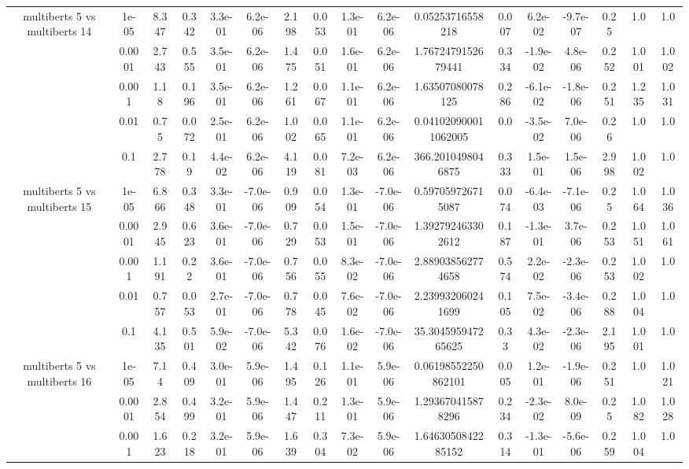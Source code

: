 \begin{tabular}{|c|c|c|c|c|c|c|c|c|c|c|c|c|c|c|c|c|}
\hline
\multirow{5}{*}{multiberts 5 vs multiberts 14} & 1e-05 & 8.347 & 0.342 & 3.3e-01 & 6.2e-06 & 2.198 & 0.053 & 1.3e-01 & 6.2e-06 & 0.05253716558218 & 0.007 & 6.2e-02 & -9.7e-07 & 0.25 & 1.0 & 1.0 \\
 & 0.0001 & 2.743 & 0.555 & 3.5e-01 & 6.2e-06 & 1.475 & 0.051 & 1.6e-01 & 6.2e-06 & 1.7672479152679441 & 0.334 & -1.9e-02 & 4.8e-06 & 0.252 & 1.001 & 1.002 \\
 & 0.001 & 1.18 & 0.196 & 3.5e-01 & 6.2e-06 & 1.261 & 0.067 & 1.1e-01 & 6.2e-06 & 1.63507080078125 & 0.286 & -6.1e-02 & -1.8e-06 & 0.251 & 1.235 & 1.031 \\
 & 0.01 & 0.75 & 0.072 & 2.5e-01 & 6.2e-06 & 1.002 & 0.065 & 1.1e-01 & 6.2e-06 & 0.041020900011062005 & 0.0 & -3.5e-02 & 7.0e-06 & 0.26 & 1.0 & 1.0 \\
 & 0.1 & 2.778 & 0.19 & 4.4e-02 & 6.2e-06 & 4.119 & 0.081 & 7.2e-03 & 6.2e-06 & 366.2010498046875 & 0.333 & 1.5e-01 & 1.5e-06 & 2.998 & 1.002 & 1.0 \\
\hline
\multirow{5}{*}{multiberts 5 vs multiberts 15} & 1e-05 & 6.866 & 0.348 & 3.3e-01 & -7.0e-06 & 0.909 & 0.054 & 1.3e-01 & -7.0e-06 & 0.597059726715087 & 0.074 & -6.4e-03 & -7.1e-06 & 0.25 & 1.064 & 1.036 \\
 & 0.0001 & 2.945 & 0.623 & 3.6e-01 & -7.0e-06 & 0.729 & 0.053 & 1.5e-01 & -7.0e-06 & 1.392792463302612 & 0.187 & -1.3e-01 & 3.7e-06 & 0.253 & 1.051 & 1.061 \\
 & 0.001 & 1.191 & 0.22 & 3.6e-01 & -7.0e-06 & 0.756 & 0.055 & 8.3e-02 & -7.0e-06 & 2.889038562774658 & 0.574 & 2.2e-02 & -2.3e-06 & 0.253 & 1.002 & 1.0 \\
 & 0.01 & 0.757 & 0.053 & 2.7e-01 & -7.0e-06 & 0.778 & 0.045 & 7.6e-02 & -7.0e-06 & 2.239932060241699 & 0.105 & 7.5e-02 & -3.4e-06 & 0.288 & 1.004 & 1.0 \\
 & 0.1 & 4.135 & 0.501 & 5.9e-02 & -7.0e-06 & 5.342 & 0.076 & 1.6e-02 & -7.0e-06 & 35.304595947265625 & 0.33 & 4.3e-02 & -2.3e-06 & 2.195 & 1.001 & 1.0 \\
\hline
\multirow{5}{*}{multiberts 5 vs multiberts 16} & 1e-05 & 7.14 & 0.409 & 3.0e-01 & 5.9e-06 & 1.495 & 0.126 & 1.1e-01 & 5.9e-06 & 0.06198552250862101 & 0.005 & 1.2e-01 & -1.9e-06 & 0.251 & 1.0 & 1.021 \\
 & 0.0001 & 2.854 & 0.499 & 3.2e-01 & 5.9e-06 & 1.447 & 0.211 & 1.3e-01 & 5.9e-06 & 1.293670415878296 & 0.234 & -2.3e-02 & 8.0e-09 & 0.25 & 1.082 & 1.028 \\
 & 0.001 & 1.623 & 0.218 & 3.2e-01 & 5.9e-06 & 1.639 & 0.304 & 7.3e-02 & 5.9e-06 & 1.6463050842285152 & 0.314 & -1.3e-01 & -5.6e-06 & 0.259 & 1.004 & 1.0 \\

\end{tabular}
